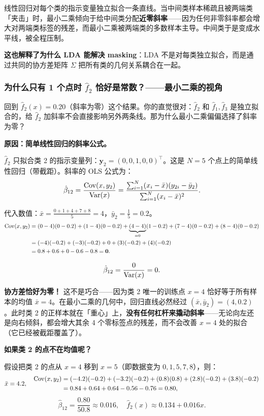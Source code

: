线性回归对每个类的指示变量独立拟合一条直线。当中间类样本稀疏且被两端类「夹击」时，最小二乘倾向于给中间类分配\textbf{近零斜率}——因为任何非零斜率都会增大对两端类标签的残差，而最小二乘被两端类的多数样本主导。中间类于是变成水平线，被全程压制。

\textbf{这也解释了为什么 LDA 能解决 masking}：LDA 不是对每类独立拟合，而是通过共同的协方差矩阵 $\Sigma$ 把所有类的几何关系耦合在一起。

\subsubsection{为什么只有 1 个点时 $\hat{f}_2$ 恰好是常数？——最小二乘的视角}

回到 $\hat{f}_2(x) = 0.20$（斜率为零）这个结果。你的直觉很对：$\hat{f}_2$ 和 $\hat{f}_1, \hat{f}_3$ 是独立拟合的，给 $\hat{f}_2$ 加斜率不会直接影响另外两条线。那为什么最小二乘偏偏选择了斜率为零？

\medskip
\noindent\textbf{原因：简单线性回归的斜率公式。}

$\hat{f}_2$ 只拟合类 2 的指示变量列：$\mathbf{y}_2 = (0,0,1,0,0)^\top$。这是 $N=5$ 个点上的简单线性回归（带截距）。斜率的 OLS 公式为：
\[
\hat{\beta}_{12} = \frac{\mathrm{Cov}(x, y_2)}{\mathrm{Var}(x)}
= \frac{\sum_{i=1}^{N} (x_i - \bar{x})(y_{2i} - \bar{y}_2)}{\sum_{i=1}^{N} (x_i - \bar{x})^2}.
\]

代入数值：$\bar{x} = \frac{0+1+4+7+8}{5} = 4$，$\bar{y}_2 = \frac{1}{5} = 0.2$。
\[
\begin{aligned}
\mathrm{Cov}(x, y_2) &= (0-4)(0-0.2) + (1-4)(0-0.2) + \underbrace{(4-4)}_{=0}(1-0.2) + (7-4)(0-0.2) + (8-4)(0-0.2) \\
&= (-4)(-0.2) + (-3)(-0.2) + 0 + (3)(-0.2) + (4)(-0.2) \\
&= 0.8 + 0.6 + 0 - 0.6 - 0.8 = \mathbf{0}.
\end{aligned}
\]

\[
\hat{\beta}_{12} = \frac{0}{\mathrm{Var}(x)} = 0.
\]

\textbf{协方差恰好为零！} 这不是巧合——因为类 2 唯一的训练点 $x=4$ 恰好等于所有样本的均值 $\bar{x}=4$。在最小二乘的几何中，回归直线必然经过 $(\bar{x}, \bar{y}_2) = (4, 0.2)$。此时类 2 的正样本就在「重心」上，\textbf{没有任何杠杆来撬动斜率}——无论向左还是向右倾斜，都会增大其余 4 个零标签点的残差，而不会改善 $x=4$ 处的拟合（它已经被截距覆盖了）。

\medskip
\noindent\textbf{如果类 2 的点不在均值呢？}

假设把类 2 的点从 $x=4$ 移到 $x=5$（即数据变为 $0,1,5,7,8$），则：
\[
\bar{x} = 4.2,\quad
\begin{aligned}
\mathrm{Cov}(x, y_2) &= (-4.2)(-0.2) + (-3.2)(-0.2) + (0.8)(0.8) + (2.8)(-0.2) + (3.8)(-0.2) \\
&= 0.84 + 0.64 + 0.64 - 0.56 - 0.76 = 0.80,
\end{aligned}
\]
\[
\hat{\beta}_{12} = \frac{0.80}{50.8} \approx 0.016,\quad
\hat{f}_2(x) \approx 0.134 + 0.016x.
\]

